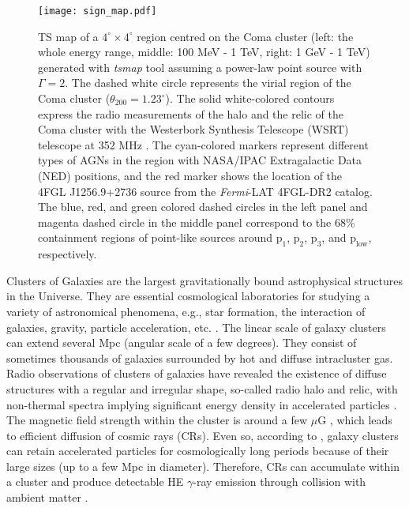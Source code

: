 \documentclass[fleqn,usenatbib]{mnras}
\begin{document}
\begin{figure*}
 \centering
\texttt{[image: sign\_map.pdf]}
\caption{TS map of a $\mathrm{4^{\circ} \times 4^{\circ}}$ region centred on the Coma cluster (left: the whole energy range, middle: 100 MeV - 1 TeV, right: 1 GeV - 1 TeV) generated with \textit{tsmap} tool assuming a power-law point source with $\Gamma=2$. The dashed white circle represents the virial region of the Coma cluster ($\theta_{200} = 1.23^{\circ}$). The solid white-colored contours express the radio measurements of the halo and the relic of the Coma cluster with the Westerbork Synthesis Telescope (WSRT) telescope at 352 MHz \citep{2011MNRAS.412....2B}. The cyan-colored markers represent different types of AGNs in the region with NASA/IPAC Extragalactic Data (NED) positions, and the red marker shows the location of the 4FGL J1256.9+2736 source from the \textit{Fermi}-LAT 4FGL-DR2 catalog.
The blue, red, and green colored dashed circles in the left panel and magenta dashed circle in the middle panel correspond to the 68\% containment regions of point-like sources around $\mathrm{p_1}$, $\mathrm{p_2}$, $\mathrm{p_3}$, and $\mathrm{p_{low}}$, respectively.} 
\label{fig:fig1}
\end{figure*}


Clusters of Galaxies are the largest gravitationally bound astrophysical structures in the Universe. They are essential cosmological laboratories for studying a variety of astronomical phenomena, e.g., star formation, the interaction of galaxies,  gravity, particle acceleration, etc. \citep{1996SSRv...75..279V}.
The linear scale of galaxy clusters can extend several Mpc (angular scale of a few degrees). They consist of sometimes thousands of galaxies surrounded by hot and diffuse intracluster gas.
Radio observations of clusters of galaxies have revealed the existence of diffuse structures with a regular and irregular shape, so-called radio halo and relic, with non-thermal spectra implying significant energy density in accelerated particles \citep{Radio1993ApJ...406..399G, 2000NewA....5..335G}. 
The magnetic field strength within the cluster is around a few $\mu$G \citep{2002ARA&A..40..319C, 2004IJMPD..13.1549G, 2010A&A...513A..30B, 2018SSRv..214..122D}, which leads to efficient diffusion of cosmic rays (CRs). Even so, according to \citet{1984ARA&A..22..425H}, galaxy clusters can retain accelerated particles for cosmologically long periods because of their large sizes (up to a few Mpc in diameter). Therefore, CRs can accumulate within a cluster and produce detectable HE $\gamma$-ray emission through collision with ambient matter \citep{1996SSRv...75..279V, 1997ApJ...487..529B}.
\end{document}
